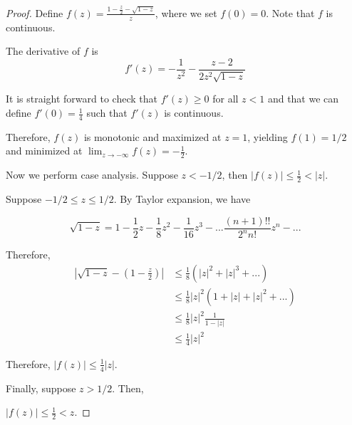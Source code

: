 \begin{proof}

Define $f(z) = \frac{1 - \frac{z}{2} - \sqrt{ 1 - z}}{z}$, where we set $f(0) = 0$. Note that $f$ is continuous. 

The derivative of $f$ is 
\[
f'(z) = - \frac{1}{z^2} - \frac{z - 2}{2 z^2 \sqrt{1-z}}
\]

It is straight forward to check that $f'(z) \geq 0$ for all $z < 1$ and that we can define $f'(0) = \frac{1}{4}$ such that $f'(z)$ is continuous.

Therefore, $f(z)$ is monotonic and maximized at $z = 1$, yielding $f(1) = 1/2$ and minimized at $\lim_{z \rightarrow -\infty} f(z) = -\frac{1}{2}$. 

Now we perform case analysis. Suppose $z < -1/2$, then $|f(z)| \leq \frac{1}{2} < |z|$.

Suppose $-1/2 \leq z \leq 1/2$. By Taylor expansion, we have

\[
\sqrt{1 - z} = 1 - \frac{1}{2} z - \frac{1}{8} z^2 - \frac{1}{16} z^3  - ... \frac{(n+1)!!}{2^n n!} z^n - ... 
\]


Therefore,
\begin{align*}
\left| \sqrt{1-z} - (1 - \frac{z}{2}) \right| &\leq
     \frac{1}{8} (|z|^2 + |z|^3 + ... ) \\
  &\leq \frac{1}{8} |z|^2 ( 1 + |z| + |z|^2 + ...) \\
  &\leq \frac{1}{8} |z|^2 \frac{1}{1 - |z|} \\
  &\leq \frac{1}{4} |z|^2 
\end{align*}

Therefore, $|f(z)| \leq \frac{1}{4} |z|$. 

Finally, suppose $z > 1/2$. Then, 

$|f(z)| \leq \frac{1}{2} < z$. 




\end{proof}

